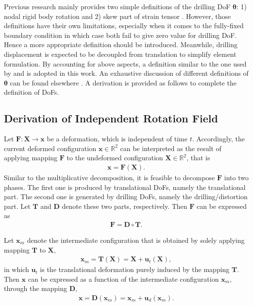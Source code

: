 \documentclass[3p,sort&compress,review,11pt]{elsarticle}
\newcommand*{\mb}{\bm}
\begin{document}
Previous research mainly provides two simple definitions of the drilling DoF $\mb{\theta}$: 1) nodal rigid body rotation \citep{Allman1984} and 2) skew part of strain tensor \citep[e.g.,][]{Hughes1989,Ibrahimbegovic1990,Ibrahimbegovic1992,Ibrahimbegovic1993,Boutagouga2016}. However, those definitions have their own limitations, especially when it comes to the fully-fixed boundary condition in which case both fail to give zero value for drilling DoF. Hence a more appropriate definition should be introduced. Meanwhile, drilling displacement is expected to be decoupled from translation to simplify element formulation. By accounting for above aspects, a definition similar to the one used by \citet{Sze1992} and \citet{Long1994} is adopted in this work. An exhaustive discussion of different definitions of $\mb{\theta}$ can be found elsewhere \citep{Long2009}. A derivation is provided as follows to complete the definition of DoFs.
\subsection{Derivation of Independent Rotation Field}
Let $\mb{F}:\mb{X}\rightarrow\mb{x}$ be a deformation, which is independent of time $t$. Accordingly, the current deformed configuration $\mb{x}\in\mathbb{R}^2$ can be interpreted as the result of applying mapping $\mb{F}$ to the undeformed configuration $\mb{X}\in\mathbb{R}^2$, that is
\begin{gather}\label{eq:mapping}
\mb{x=F\left(X\right)}.
\end{gather}
Similar to the multiplicative decomposition, it is feasible to decompose $\mb{F}$ into two phases. The first one is produced by translational DoFs, namely the translational part. The second one is generated by drilling DoFs, namely the drilling/distortion part. Let $\mb{T}$ and $\mb{D}$ denote these two parts, respectively. Then $\mb{F}$ can be expressed as
\begin{gather*}
\mb{F=D\circ{}T}.
\end{gather*}

Let $\mb{x}_m$ denote the intermediate configuration that is obtained by solely applying mapping $\mb{T}$ to $\mb{X}$,
\begin{gather*}
\mb{x}_m=\mb{T}\left(\mb{X}\right)=\mb{X}+\mb{u}_t\left(\mb{X}\right),
\end{gather*}
in which $\mb{u}_t$ is the translational deformation purely induced by the mapping $\mb{T}$. Then $\mb{x}$ can be expressed as a function of the intermediate configuration $\mb{x}_m$, through the mapping $\mb{D}$,
\begin{gather*}
\mb{x}=\mb{D}\left(\mb{x}_m\right)=\mb{x}_m+\mb{u}_d\left(\mb{x}_m\right).
\end{gather*}
\end{document}
